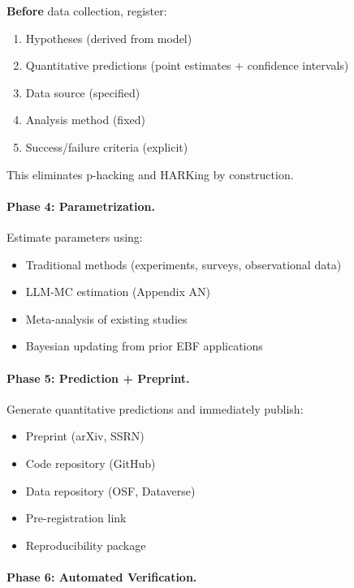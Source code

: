 \textbf{Before} data collection, register:
\begin{enumerate}[nosep]
    \item Hypotheses (derived from model)
    \item Quantitative predictions (point estimates + confidence intervals)
    \item Data source (specified)
    \item Analysis method (fixed)
    \item Success/failure criteria (explicit)
\end{enumerate}

This eliminates p-hacking and HARKing by construction.

\paragraph{Phase 4: Parametrization.}

Estimate parameters using:
\begin{itemize}[nosep]
    \item Traditional methods (experiments, surveys, observational data)
    \item LLM-MC estimation (Appendix AN)
    \item Meta-analysis of existing studies
    \item Bayesian updating from prior EBF applications
\end{itemize}

\paragraph{Phase 5: Prediction + Preprint.}

Generate quantitative predictions and immediately publish:
\begin{itemize}[nosep]
    \item Preprint (arXiv, SSRN)
    \item Code repository (GitHub)
    \item Data repository (OSF, Dataverse)
    \item Pre-registration link
    \item Reproducibility package
\end{itemize}

\paragraph{Phase 6: Automated Verification.}

